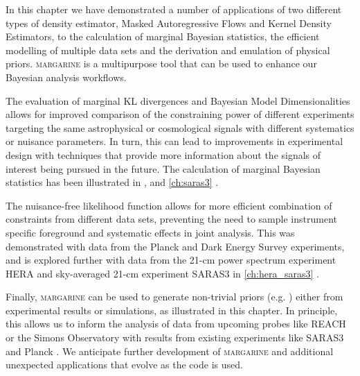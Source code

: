 In this chapter we have demonstrated a number of applications of two different types of density estimator, Masked Autoregressive Flows and Kernel Density Estimators, to the calculation of marginal Bayesian statistics, the efficient modelling of multiple data sets and the derivation and emulation of physical priors. \textsc{margarine} is a multipurpose tool that can be used to enhance our Bayesian analysis workflows.

The evaluation of marginal KL divergences and Bayesian Model Dimensionalities allows for improved comparison of the constraining power of different experiments targeting the same astrophysical or cosmological signals with different systematics or nuisance parameters. In turn, this can lead to improvements in experimental design with techniques that provide more information about the signals of interest being pursued in the future. The calculation of marginal Bayesian statistics has been illustrated in \cite{Scheutwinkel2022b}, \cite{Anstey_lst_2022} and \cref{ch:saras3} \cite{Bevins_saras3_2022}.

The nuisance-free likelihood function allows for more efficient combination of constraints from different data sets, preventing the need to sample instrument specific foreground and systematic effects in joint analysis. This was demonstrated with data from the Planck and Dark Energy Survey experiments, and is explored further with data from the 21-cm power spectrum experiment HERA and sky-averaged 21-cm experiment SARAS3 in \cref{ch:hera_saras3} \citep{Bevins_hera_saras3_2023}.

Finally, \textsc{margarine} can be used to generate non-trivial priors (e.g. \cite{Alsing_bijectors_2021}) either from experimental results or simulations, as illustrated in this chapter. In principle, this allows us to inform the analysis of data from upcoming probes like REACH \citep{de_lera_acedo_reach_2022} or the Simons Observatory \citep{Simons_Obs_2019, Simons_obs_2019b} with results from existing experiments like SARAS3 \citep{Bevins_saras3_2022} and Planck \citep{Planck2018}. We anticipate further development of \textsc{margarine} and additional unexpected applications that evolve as the code is used.
